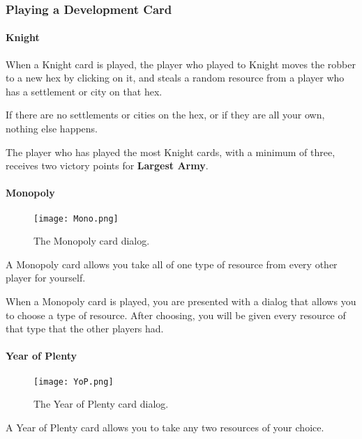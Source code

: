 \documentclass[12pt,letterpaper,titlepage]{article}
\begin{document}
		\subsubsection{Playing a Development Card}
			\paragraph{Knight}
			When a Knight card is played, the player who played to Knight moves the robber to a new hex by clicking on it, and steals a random resource from a player who has a settlement or city on that hex.
			
			If there are no settlements or cities on the hex, or if they are all your own, nothing else happens.
			
			The player who has played the most Knight cards, with a minimum of three, receives two victory points for \textbf{Largest Army}.
			
			\paragraph{Monopoly}
			\begin{wrapfigure}{r}{.5\textwidth}
				\vspace{-50pt}
				\begin{center}
					\texttt{[image: Mono.png]}
				\end{center}
				\vspace{-20pt}
				\caption{The Monopoly card dialog.}
				\vspace{-50pt}
			\end{wrapfigure}
			A Monopoly card allows you take all of one type of resource from every other player for yourself.
			
			When a Monopoly card is played, you are presented with a dialog that allows you to choose a type of resource. After choosing, you will be given every resource of that type that the other players had.
			
			\paragraph{Year of Plenty}
			\begin{wrapfigure}{r}{.5\textwidth}
				\vspace{-30pt}
				\begin{center}
					\texttt{[image: YoP.png]}
				\end{center}
				\vspace{-20pt}
				\caption{The Year of Plenty card dialog.}
				\vspace{-25pt}
			\end{wrapfigure}
			A Year of Plenty card allows you to take any two resources of your choice.
			
\end{document}
